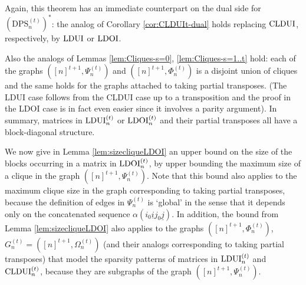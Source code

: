 \documentclass[11pt]{article}
\newcommand{\CLDUI}{\text{\rm CLDUI}}
\newcommand{\LDUI}{\text{\rm LDUI}}
\newcommand{\LDOI}{\text{\rm LDOI}}
\newcommand{\DPSt}{\mathrm{DPS}^{(t)}}
\newcommand{\ui}{\underline{i}}
\newcommand{\uj}{\underline{j}}
\newcommand{\uk}{\underline{k}}
\theoremstyle{plain}
\newtheorem{lemma}[satz]{Lemma}
\begin{document}
Again, this theorem has an immediate counterpart on  the dual side for $(\DPSt_n)^*$: the analog of Corollary \ref{cor:CLDUIt-dual} holds replacing $\CLDUI$, respectively,  by $\LDUI$ or $\LDOI$. 

Also the analogs of Lemmas \ref{lem:Cliques-s=0}, \ref{lem:Cliques-s=1..t}  hold:
each of the graphs $([n]^{t+1}, \Psi^{(t)}_n)$ and $([n]^{t+1},\Phi^{(t)}_n)$ is a disjoint union of cliques and the same holds for the graphs attached to taking partial transposes. (The  LDUI case follows from the CLDUI case up to a transposition and the proof in the LDOI case is in fact even easier since it involves a parity argument). In summary, matrices in $\LDUI^{(t)}_n$ or $\LDOI^{(t)}_n$ and their partial transposes all have a block-diagonal structure.






\medskip
We now give in Lemma \ref{lem:sizecliqueLDOI} an upper bound on the size of the blocks occurring in a matrix in $\LDOI^{(t)}_n$, by upper bounding the maximum size of  a clique in the graph $([n]^{t+1}, \Psi^{(t)}_n)$. Note that this bound also applies to the maximum clique size in the graph corresponding to taking  partial transposes, because the definition of edges in $\Psi^{(t)}_n$ is `global' in the sense that it depends only on the concatenated sequence $\alpha(i_0\ui j_0\uj)$. In addition, the  bound from Lemma \ref{lem:sizecliqueLDOI} also applies to the  graphs $([n]^{t+1}, \Phi^{(t)}_n)$, $G^{(t)}_n=([n]^{t+1}, \Omega^{(t)}_n)$ (and their analogs corresponding to taking partial transposes) that   model the sparsity patterns of matrices in $\LDUI^{(t)}_n$ and $\CLDUI^{(t)}_n$, because  they  are subgraphs of the graph $([n]^{t+1}, \Psi^{(t)}_n)$.
\end{document}
